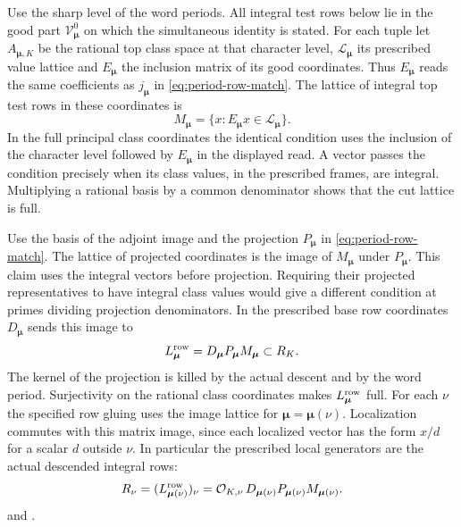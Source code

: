 Use the sharp level of the word periods. All integral test rows
below lie in the good part \(\mathcal V^0_{\boldsymbol\mu}\) on
which the simultaneous identity is stated. For each tuple let
\(A_{\boldsymbol\mu,K}\) be the rational top class space at that
character level, \(\mathscr L_{\boldsymbol\mu}\) its prescribed
value lattice and \(E_{\boldsymbol\mu}\) the inclusion matrix
of its good coordinates. Thus \(E_{\boldsymbol\mu}\) reads the
same coefficients as \(j_{\boldsymbol\mu}\) in
\eqref{eq:period-row-match}. The lattice of integral top test
rows in these coordinates is
\[
 M_{\boldsymbol\mu}
   = \{x:E_{\boldsymbol\mu}x\in\mathscr L_{\boldsymbol\mu}\}.
\]
In the full principal class coordinates the identical condition
uses the inclusion of the character level followed by
\(E_{\boldsymbol\mu}\) in the displayed read. A vector passes the
condition precisely when its class values, in the prescribed
frames, are integral. Multiplying a rational basis by a common
denominator shows that the cut lattice is full.

Use the basis of the adjoint image and the projection
\(P_{\boldsymbol\mu}\) in \eqref{eq:period-row-match}. The lattice
of projected coordinates is the image of \(M_{\boldsymbol\mu}\)
under \(P_{\boldsymbol\mu}\). This claim uses the integral
vectors before projection. Requiring their projected representatives
to have integral class values would give a different condition
at primes dividing projection denominators. In the prescribed
base row coordinates \(D_{\boldsymbol\mu}\) sends this image to
\[
 L_{\boldsymbol\mu}^{\rm row}
    =D_{\boldsymbol\mu}P_{\boldsymbol\mu}M_{\boldsymbol\mu}
       \subset R_K .
\]
The kernel of the projection is killed by the actual descent
and by the word period. Surjectivity on the rational class
coordinates makes \(L_{\boldsymbol\mu}^{\rm row}\) full.
For each \(\nu\) the specified row gluing uses the image lattice
for \(\boldsymbol\mu=\boldsymbol\mu(\nu)\).
Localization commutes with this matrix image, since each
localized vector has the form \(x/d\) for a scalar \(d\) outside
\(\nu\). In particular the prescribed local generators are the
actual descended integral rows:
\begin{equation}
 \label{eq:period-selected-local-row-lattice}
 R_\nu
  = (L_{\boldsymbol\mu(\nu)}^{\rm row})_\nu
  =\mathcal O_{K,\nu}\,
       D_{\boldsymbol\mu(\nu)}P_{\boldsymbol\mu(\nu)}
                                      M_{\boldsymbol\mu(\nu)} .
\end{equation}
 and
.


